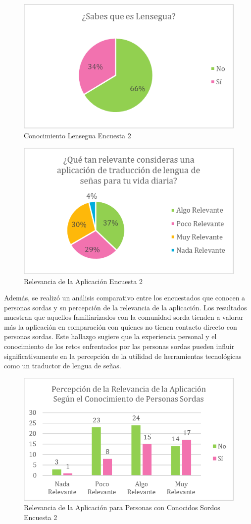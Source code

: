 \begin{figure} [H]
    \centering
    \includegraphics[width=0.5\linewidth]{figuras/conocimiento_lensegua.png}
    \caption{Conocimiento Lensegua Encuesta 2}
    \label{fig:enter-label}
\end{figure}

\begin{figure} [H]
    \centering
    \includegraphics[width=0.5\linewidth]{figuras/relevancia_app.png}
    \caption{ Relevancia de la Aplicación Encuesta 2}
    \label{fig:enter-label}
\end{figure}


Además, se realizó un análisis comparativo entre los encuestados que conocen a personas sordas y su percepción de la relevancia de la aplicación. Los resultados muestran que aquellos familiarizados con la comunidad sorda tienden a valorar más la aplicación en comparación con quienes no tienen contacto directo con personas sordas. Este hallazgo sugiere que la experiencia personal y el conocimiento de los retos enfrentados por las personas sordas pueden influir significativamente en la percepción de la utilidad de herramientas tecnológicas como un traductor de lengua de señas.

\begin{figure} [H]
    \centering
    \includegraphics[width=0.5\linewidth]{figuras/relevancia_app_conocidos.png}
    \caption{Relevancia de la Aplicación para Personas con Conocidos Sordos Encuesta 2}
    \label{fig:enter-label}
\end{figure}

